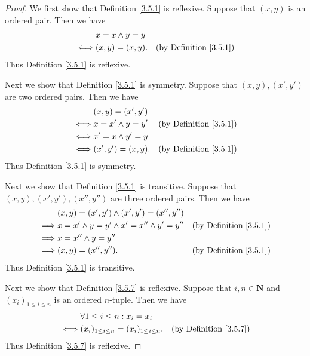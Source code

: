 \begin{proof}
    We first show that Definition \ref{3.5.1} is reflexive.
    Suppose that \((x, y)\) is an ordered pair.
    Then we have
    \begin{align*}
             & x = x \land y = y                                      \\
        \iff & (x, y) = (x, y).  & \text{(by Definition \ref{3.5.1})}
    \end{align*}
    Thus Definition \ref{3.5.1} is reflexive.

    Next we show that Definition \ref{3.5.1} is symmetry.
    Suppose that \((x, y), (x', y')\) are two ordered pairs.
    Then we have
    \begin{align*}
             & (x, y) = (x', y')                                        \\
        \iff & x = x' \land y = y' & \text{(by Definition \ref{3.5.1})} \\
        \iff & x' = x \land y' = y                                      \\
        \iff & (x', y') = (x, y).  & \text{(by Definition \ref{3.5.1})}
    \end{align*}
    Thus Definition \ref{3.5.1} is symmetry.

    Next we show that Definition \ref{3.5.1} is transitive.
    Suppose that \((x, y), (x', y'), (x'', y'')\) are three ordered pairs.
    Then we have
    \begin{align*}
                 & (x, y) = (x', y') \land (x', y') = (x'', y'')                                          \\
        \implies & x = x' \land y = y' \land x' = x'' \land y' = y'' & \text{(by Definition \ref{3.5.1})} \\
        \implies & x = x'' \land y = y''                                                                  \\
        \implies & (x, y) = (x'', y'').                              & \text{(by Definition \ref{3.5.1})}
    \end{align*}
    Thus Definition \ref{3.5.1} is transitive.

    Next we show that Definition \ref{3.5.7} is reflexive.
    Suppose that \(i, n \in \mathbf{N}\) and \((x_i)_{1 \leq i \leq n}\) is an ordered \(n\)-tuple.
    Then we have
    \begin{align*}
             & \forall 1 \leq i \leq n : x_i = x_i                                                     \\
        \iff & (x_i)_{1 \leq i \leq n} = (x_i)_{1 \leq i \leq n}. & \text{(by Definition \ref{3.5.7})}
    \end{align*}
    Thus Definition \ref{3.5.7} is reflexive.


\end{proof}
